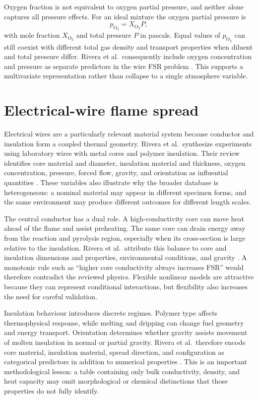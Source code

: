 Oxygen fraction is not equivalent to oxygen partial pressure, and neither alone captures all pressure effects. For an ideal mixture the oxygen partial pressure is
\begin{equation}
    p_{\mathrm{O_2}} = X_{\mathrm{O_2}} P,
    \label{eq:oxygen_partial_pressure}
\end{equation}
with mole fraction \(X_{\mathrm{O_2}}\) and total pressure \(P\) in pascals. Equal values of \(p_{\mathrm{O_2}}\) can still coexist with different total gas density and transport properties when diluent and total pressure differ. Rivera et al.\ consequently include oxygen concentration and pressure as separate predictors in the wire FSR problem \cite{riveraWireML}. This supports a multivariate representation rather than collapse to a single atmosphere variable.

\section{Electrical-wire flame spread}

Electrical wires are a particularly relevant material system because conductor and insulation form a coupled thermal geometry. Rivera et al.\ synthesize experiments using laboratory wires with metal cores and polymer insulation. Their review identifies core material and diameter, insulation material and thickness, oxygen concentration, pressure, forced flow, gravity, and orientation as influential quantities \cite{riveraWireML}. These variables also illustrate why the broader database is heterogeneous: a nominal material may appear in different specimen forms, and the same environment may produce different outcomes for different length scales.

The central conductor has a dual role. A high-conductivity core can move heat ahead of the flame and assist preheating. The same core can drain energy away from the reaction and pyrolysis region, especially when its cross-section is large relative to the insulation. Rivera et al.\ attribute this balance to core and insulation dimensions and properties, environmental conditions, and gravity \cite{riveraWireML}. A monotonic rule such as ``higher core conductivity always increases FSR'' would therefore contradict the reviewed physics. Flexible nonlinear models are attractive because they can represent conditional interactions, but flexibility also increases the need for careful validation.

Insulation behaviour introduces discrete regimes. Polymer type affects thermophysical response, while melting and dripping can change fuel geometry and energy transport. Orientation determines whether gravity assists movement of molten insulation in normal or partial gravity. Rivera et al.\ therefore encode core material, insulation material, spread direction, and configuration as categorical predictors in addition to numerical properties \cite{riveraWireML}. This is an important methodological lesson: a table containing only bulk conductivity, density, and heat capacity may omit morphological or chemical distinctions that those properties do not fully identify.

